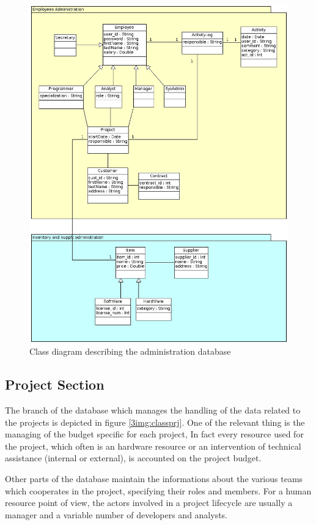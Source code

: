 \begin{figure}[H]
\centering
\includegraphics[scale=0.50]{assign3/argo/imgs/administrative.png}
\caption{Class diagram describing the administration database}
\label{3img:classadmin}
\end{figure}

\subsection{Project Section}
The branch of the database which manages the handling of the data related
to the projects is depicted in figure \ref{3img:classprj}.
One of the relevant thing is the managing of the budget specific for each
project, In fact every resource used for the project, which often is an
hardware resource or an intervention of technical assistance (internal or
external), is accounted on the project budget.

Other parts of the database maintain the informations about the various
teams which cooperates in the project, specifying their roles and members.
For a human resource point of view, the actors involved in a project
lifecycle are usually a manager and a variable number of developers and
analysts. 

